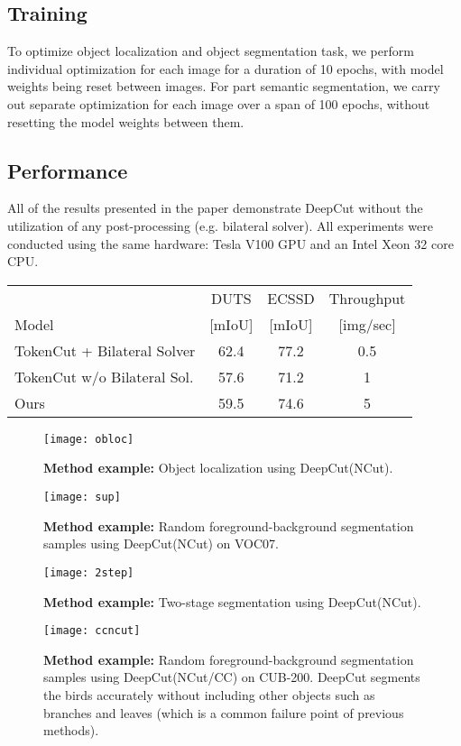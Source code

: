 \documentclass[10pt,twocolumn,letterpaper]{article}
\begin{document}
\subsection{Training}
To optimize object localization and object segmentation task, we perform individual optimization for each image for a duration of 10 epochs, with model weights being reset between images. For part semantic segmentation, we carry out separate optimization for each image over a span of 100 epochs, without resetting the model weights between them.

\subsection{Performance}
All of the results presented in the paper demonstrate DeepCut without the utilization of any post-processing (e.g. bilateral solver). All experiments were conducted using the same hardware: Tesla V100 GPU and an Intel Xeon 32 core CPU.

\noindent
\begin{tabular}{|l|c|c|c|}
\hline
            & DUTS & ECSSD & Throughput \\
  Model  & [mIoU] & [mIoU] & [img/sec] \\ \hline
TokenCut + Bilateral Solver & 62.4 & 77.2 & 0.5 \\ \hline
TokenCut w/o Bilateral Sol. & 57.6 & 71.2 & 1 \\ \hline
Ours          & 59.5 & 74.6  & 5 \\ \hline
\end{tabular}

\begin{figure*}[ht]
\centering
\texttt{[image: obloc]}
\caption{
\textbf{Method example:} Object localization using DeepCut(NCut).
}
\label{fig:obloc}
\end{figure*}

\begin{figure*}[ht]
\centering
\texttt{[image: sup]}
\caption{
\textbf{Method example:} Random foreground-background segmentation samples using DeepCut(NCut) on VOC07.
}
\label{fig:seg}
\end{figure*}

\begin{figure*}[ht]
\centering
\texttt{[image: 2step]}
\caption{
\textbf{Method example:} Two-stage segmentation using DeepCut(NCut).
}
\label{fig:2stp}
\end{figure*}

\begin{figure*}[ht]
\centering
\texttt{[image: ccncut]}
\caption{
\textbf{Method example:} Random foreground-background segmentation samples using DeepCut(NCut/CC) on CUB-200. DeepCut segments the birds accurately without including other objects such as branches and leaves (which is a common failure point of previous methods).
}
\label{fig:ccncut}
\end{figure*}
\end{document}
